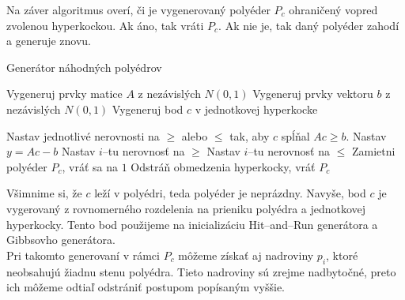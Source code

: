 Na záver algoritmus overí, či je vygenerovaný polyéder $P_c$ ohraničený vopred zvolenou hyperkockou. Ak áno, tak vráti $P_c$. Ak nie je, tak daný polyéder zahodí a generuje znovu.

\begin{algorithm}[H]
	\caption{Generátor náhodných polyédrov \cite{random_may}}
	\label{generator-polyedrov}
	\begin{algorithmic}[1]
		\State Vygeneruj prvky matice $A$ z nezávislých $N(0,1)$
		\State Vygeneruj prvky vektoru $b$ z nezávislých $N(0,1)$
		\State Vygeneruj bod $c$ v jednotkovej hyperkocke

		\State Nastav jednotlivé nerovnosti na $\geq$ alebo $\leq$ tak, aby $c$ spĺňal $Ac\geq b$.
		\State Nastav $y=Ac-b$
				\State Nastav $i$--tu nerovnosť na $\ge$
			\Else
				\State Nastav $i$--tu nerovnosť na $\le$
			\EndIf
		\EndFor
			\State Zamietni polyéder $P_c$, vráť sa na $1$
		\Else
			\State Odstráň obmedzenia hyperkocky, vráť $P_c$
		\EndIf
	\end{algorithmic}
\end{algorithm}

Všimnime si, že $c$ leží v polyédri, teda polyéder je neprázdny. Navyše, bod $c$ je vygerovaný z rovnomerného rozdelenia na prieniku polyédra a jednotkovej hyperkocky. Tento bod použijeme na inicializáciu Hit--and--Run generátora a Gibbsovho generátora.\\

Pri takomto generovaní v rámci $P_c$ môžeme získať aj nadroviny $p_i$, ktoré neobsahujú žiadnu stenu polyédra. Tieto nadroviny sú zrejme nadbytočné, preto ich môžeme odtiaľ odstrániť postupom popísaným vyššie.\\

